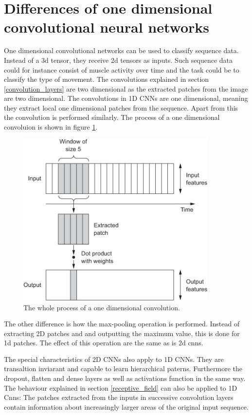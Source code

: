 \section{Differences of one dimensional \\convolutional neural networks}
\label{differences_1d_2d}
One dimensional convolutional networks can be used to classify sequence data. Instead of a 3d tensor, they receive 2d tensors as inputs. Such sequence data could for instance consist of muscle activity over time and the task could be to classify the type of movement. The convolutions explained in section \ref{convolution_layers}  are two dimensional as the extracted patches from the image are two dimensional. The convolutions in 1D CNNs are one dimensional, meaning they extract local one dimensional patches from the sequence. Apart from this the convolution is performed similarly. The process of a one dimensional convoluion is shown in figure \ref{fig:conv1d}. 
\begin{figure}[H]
	\centering
	\includegraphics[width=10cm]{images/nn/conv1d.jpg}
	\caption[Bild kurz]{The whole process of a one dimensional convolution.}
	\label{fig:conv1d}
\end{figure}

The other difference is how the max-pooling operation is performed. Instead of extracting 2D patches and and outputting the maximum value, this is done for 1d patches. The effect of this operation are the same as is 2d cnns. 

The special characteristics of 2D CNNs also apply to 1D CNNs. They are transaltion inviarant and capable to learn hierarchical paterns. Furthermore the dropout, flatten and dense layers as well as activations function in the same way. The behaviour explained in section \ref{receptive_field}  can also be applied to 1D Cnns: The patches extracted from the inputs in successive convolution layers contain information about increasingly larger areas of the original input sequence.

